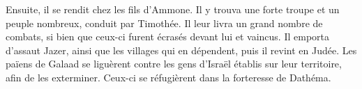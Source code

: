 Ensuite, il se rendit chez les fils d’Ammone.
	Il y trouva une forte troupe et un peuple nombreux, conduit par Timothée.
Il leur livra un grand nombre de combats,
	si bien que ceux-ci furent écrasés devant lui et vaincus.
Il emporta d’assaut Jazer, ainsi que les villages qui en dépendent,
	puis il revint en Judée.
Les païens de Galaad se liguèrent contre les gens d’Israël établis sur leur territoire,
	afin de les exterminer.
	Ceux-ci se réfugièrent dans la forteresse de Dathéma.
